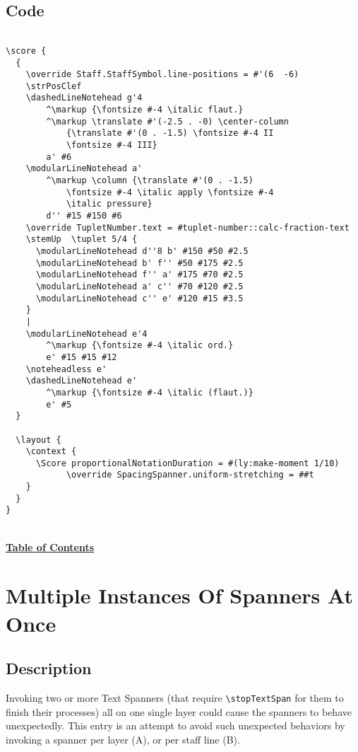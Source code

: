 \subsection{Code}
\begin{verbatim}

\score {
  {
    \override Staff.StaffSymbol.line-positions = #'(6  -6)
    \strPosClef 
    \dashedLineNotehead g'4
    	^\markup {\fontsize #-4 \italic flaut.}
    	^\markup \translate #'(-2.5 . -0) \center-column 
			{\translate #'(0 . -1.5) \fontsize #-4 II 
			\fontsize #-4 III} 
		a' #6
    \modularLineNotehead a'
    	^\markup \column {\translate #'(0 . -1.5) 
			\fontsize #-4 \italic apply \fontsize #-4 
			\italic pressure} 
		d'' #15 #150 #6
    \override TupletNumber.text = #tuplet-number::calc-fraction-text
    \stemUp  \tuplet 5/4 {
      \modularLineNotehead d''8 b' #150 #50 #2.5
      \modularLineNotehead b' f'' #50 #175 #2.5
      \modularLineNotehead f'' a' #175 #70 #2.5
      \modularLineNotehead a' c'' #70 #120 #2.5
      \modularLineNotehead c'' e' #120 #15 #3.5
    }
    |
    \modularLineNotehead e'4
    	^\markup {\fontsize #-4 \italic ord.} 
		e' #15 #15 #12
    \noteheadless e'
    \dashedLineNotehead e'
    	^\markup {\fontsize #-4 \italic (flaut.)} 
		e' #5
  }

  \layout {
    \context {
      \Score proportionalNotationDuration = #(ly:make-moment 1/10)    
      		\override SpacingSpanner.uniform-stretching = ##t
    }
  }
}

\end{verbatim}

\hyperref[sec:toc]{\\ \textbf{Table of Contents}}

\vfill \break


\section {Multiple Instances Of Spanners At Once}
\label{sec:comb_spanners}
\hfill
{}
\hfill

\subsection{Description}
Invoking two or more Text Spanners (that require \verb|\stopTextSpan| for them to finish their processes) all on one single layer could cause the spanners to behave unexpectedly. This entry is an attempt to avoid such unexpected behaviors by invoking a spanner per layer (A), or per staff line (B).

